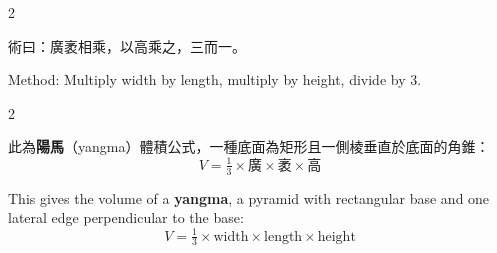 \documentclass[10pt,a4paper]{article}
\begin{document}
\vspace{0.2cm}

\begin{paracol}{2}

\begin{leftcolumn*}
\begin{methodbi}
術曰：廣袤相乘，以高乘之，三而一。
\end{methodbi}
\end{leftcolumn*}

\begin{rightcolumn*}
\begin{methodbi}
Method: Multiply width by length, multiply by height, divide by 3.
\end{methodbi}
\end{rightcolumn*}

\end{paracol}

\begin{paracol}{2}

\begin{leftcolumn*}
此為\textbf{陽馬}（yangma）體積公式，一種底面為矩形且一側棱垂直於底面的角錐：
\[V = \tfrac{1}{3} \times \text{廣} \times \text{袤} \times \text{高}\]
\end{leftcolumn*}

\begin{rightcolumn*}
This gives the volume of a \textbf{yangma}, a pyramid with rectangular base and one lateral edge perpendicular to the base:
\[V = \tfrac{1}{3} \times \text{width} \times \text{length} \times \text{height}\]
\end{rightcolumn*}

\end{paracol}
\end{document}
